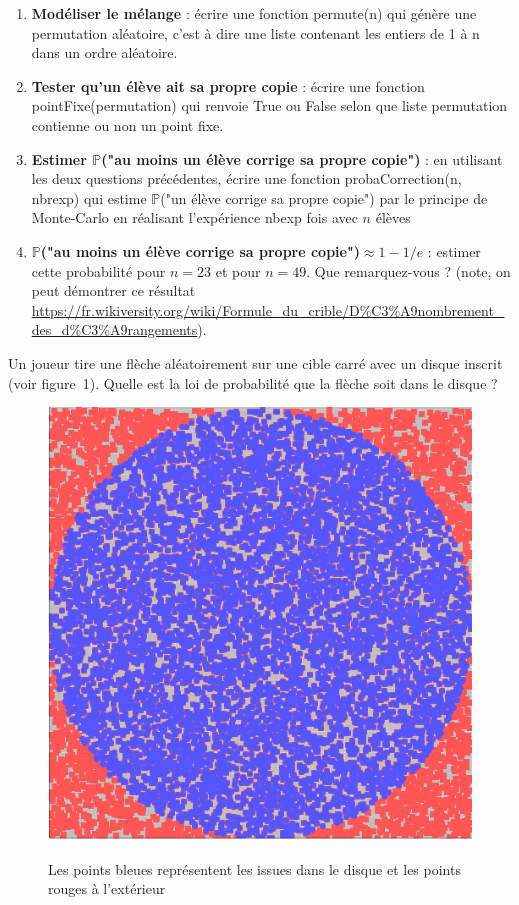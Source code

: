 \documentclass{article}
\theoremstyle{remark}
\begin{document}
  
\begin{enumerate}
\item \textbf{Modéliser le mélange} : écrire une fonction permute(n) qui génère une permutation aléatoire, c'est à dire une liste contenant les entiers de 1 à n dans un ordre aléatoire.  
\item \textbf{Tester qu'un élève ait sa propre copie} : écrire une fonction pointFixe(permutation)
qui renvoie True ou False selon que liste permutation contienne ou non un point fixe.
\item  \textbf{Estimer $\mathbb{P}$("au moins un élève corrige sa propre copie")} : en utilisant les deux questions précédentes, écrire une fonction probaCorrection(n, nbrexp)
qui estime $\mathbb{P}$("un élève corrige sa propre copie") par le principe de Monte-Carlo en réalisant l'expérience nbexp fois avec $n$ élèves
\item \textbf{$\mathbb{P}$("au moins un élève corrige sa propre copie")$\approx 1-1/e$} : estimer cette probabilité pour $n=23$ et pour $n=49$. Que remarquez-vous ?  (note, on peut démontrer ce résultat \url{https://fr.wikiversity.org/wiki/Formule_du_crible/D%C3%A9nombrement_des_d%C3%A9rangements}).
\end{enumerate}
\Exercice[Estimer $\pi$]
Un joueur tire une flèche aléatoirement sur une cible carré avec un disque inscrit (voir figure~1). 
Quelle est la loi de probabilité que la flèche soit dans le disque ?\\
\begin{figure}
\centering
\includegraphics[scale=0.25]{monteCarlo.png}
\label{monte}
\caption{Les points bleues représentent les issues dans le disque et les points rouges à l'extérieur}
\end{figure}
\end{document}
